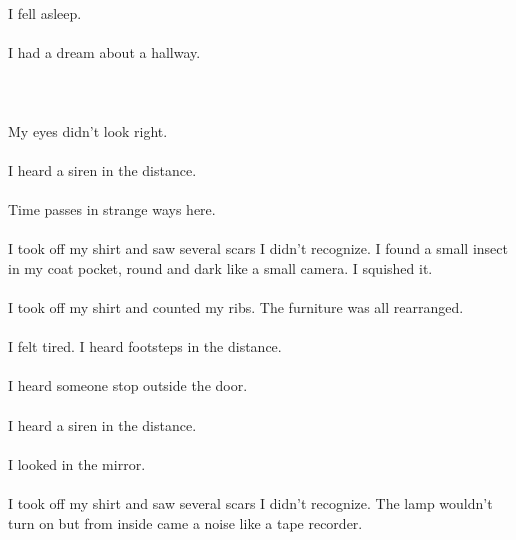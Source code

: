 \documentclass{article}
\begin{document}
    \section{}
    I fell asleep.\\\\I had a dream about a hallway.\\\\ 
    \newpage
    
    \section{}
    My eyes didn't look right. \\\\I heard a siren in the distance. \\\\Time passes in strange ways here. \\\\I took off my shirt and saw several scars I didn't recognize. I found a small insect in my coat pocket, round and dark like a small camera. I squished it. \\\\I took off my shirt and counted my ribs. The furniture was all rearranged. \\\\I felt tired. I heard footsteps in the distance. \\\\I heard someone stop outside the door. \\\\I heard a siren in the distance. \\\\I looked in the mirror. \\\\I took off my shirt and saw several scars I didn't recognize. The lamp wouldn't turn on but from inside came a noise like a tape recorder. \\\\
    \newpage
    
\end{document}

